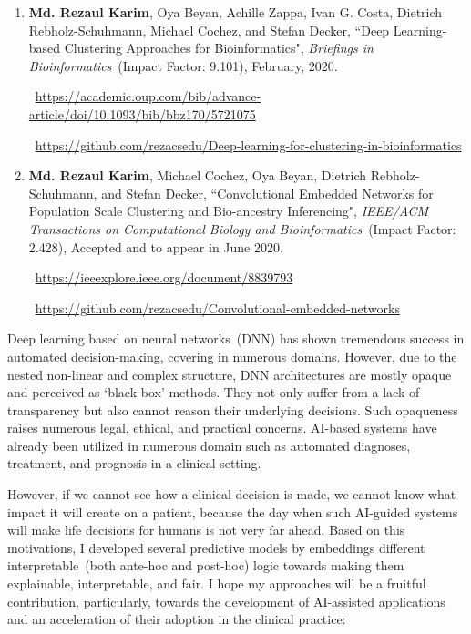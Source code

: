 \begin{appendices}
\begin{enumerate}[noitemsep]
	\item \textbf{Md. Rezaul Karim}, Oya Beyan, Achille Zappa, Ivan G. Costa, Dietrich Rebholz-Schuhmann, Michael Cochez, and Stefan Decker, ``Deep Learning-based Clustering Approaches for Bioinformatics", \emph{Briefings in Bioinformatics}~(Impact Factor: 9.101), February, 2020.
	
	\faLink~\url{https://academic.oup.com/bib/advance-article/doi/10.1093/bib/bbz170/5721075}

	\faGithub~\url{https://github.com/rezacsedu/Deep-learning-for-clustering-in-bioinformatics}
		
	\item \textbf{Md. Rezaul Karim}, Michael Cochez, Oya Beyan, Dietrich Rebholz-Schuhmann, and Stefan Decker, ``Convolutional Embedded Networks for Population Scale Clustering and Bio-ancestry Inferencing", \emph{IEEE/ACM Transactions on Computational Biology and Bioinformatics}~(Impact Factor: 2.428), Accepted and to appear in June 2020.
    
    \faLink~\url{https://ieeexplore.ieee.org/document/8839793}

	\faGithub~\url{https://github.com/rezacsedu/Convolutional-embedded-networks}
\end{enumerate}

Deep learning based on neural networks~(DNN) has shown tremendous success in automated decision-making, covering in numerous domains. However, due to the nested non-linear and complex structure, DNN architectures are mostly opaque and perceived as `black box' methods. They not only suffer from a lack of transparency but also cannot reason their underlying decisions. Such opaqueness raises numerous legal, ethical, and practical concerns. AI-based systems have already been utilized in numerous domain such as automated diagnoses, treatment, and prognosis in a clinical setting. 

\hspace*{5mm} However, if we cannot see how a clinical decision is made, we cannot know what impact it will create on a patient, because the day when such AI-guided systems will make life decisions for humans is not very far ahead. Based on this motivations, I developed several predictive models by embeddings different interpretable~(both ante-hoc and post-hoc) logic towards making them explainable, interpretable, and fair. I hope my approaches will be a fruitful contribution, particularly, towards the development of AI-assisted applications and an acceleration of their adoption in the clinical practice: 


\end{appendices}
